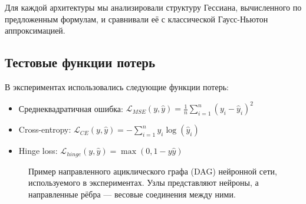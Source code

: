 \documentclass[11pt]{article}
\begin{document}
Для каждой архитектуры мы анализировали структуру Гессиана, вычисленного по предложенным формулам, и
сравнивали её с классической Гаусс-Ньютон аппроксимацией.

\subsection{Тестовые функции потерь}

В экспериментах использовались следующие функции потерь:
\begin{itemize}
  \item Среднеквадратичная ошибка: $\mathcal{L}_{MSE}(y, \hat{y}) = \frac{1}{n}\sum_{i=1}^{n}(y_i - \hat{y}_i)^2$
  \item Cross-entropy: $\mathcal{L}_{CE}(y, \hat{y}) = -\sum_{i=1}^{n}y_i\log(\hat{y}_i)$
  \item Hinge loss: $\mathcal{L}_{hinge}(y, \hat{y}) = \max(0, 1 - y\hat{y})$
\end{itemize}

\begin{figure}[t]
  \centering
  \caption{Пример направленного ациклического графа (DAG) нейронной сети, используемого в экспериментах. Узлы
  представляют нейроны, а направленные рёбра — весовые соединения между ними.}
  \label{fig:dag_example}
\end{figure}
\end{document}
